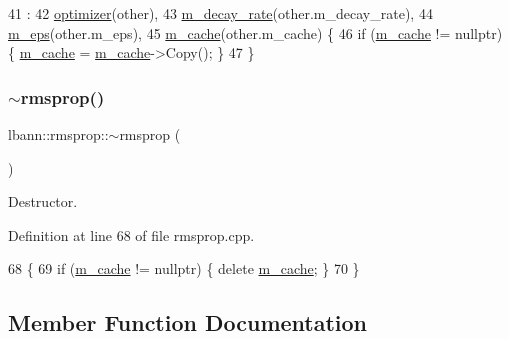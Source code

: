 \begin{DoxyCode}
41                                      :
42   \hyperlink{classlbann_1_1optimizer_a136ed79c3f279ecded5be380fb67b05f}{optimizer}(other),
43   \hyperlink{classlbann_1_1rmsprop_a9cd712c44e7c4995120e2933b0387d71}{m\_decay\_rate}(other.m\_decay\_rate),
44   \hyperlink{classlbann_1_1rmsprop_a6ea73caf5b2769451dfd798665877208}{m\_eps}(other.m\_eps),
45   \hyperlink{classlbann_1_1rmsprop_a2bbaa35bb209e971a5ac9e1dbb6ece76}{m\_cache}(other.m\_cache) \{
46   \textcolor{keywordflow}{if} (\hyperlink{classlbann_1_1rmsprop_a2bbaa35bb209e971a5ac9e1dbb6ece76}{m\_cache} != \textcolor{keyword}{nullptr}) \{ \hyperlink{classlbann_1_1rmsprop_a2bbaa35bb209e971a5ac9e1dbb6ece76}{m\_cache} = \hyperlink{classlbann_1_1rmsprop_a2bbaa35bb209e971a5ac9e1dbb6ece76}{m\_cache}->Copy(); \}
47 \}
\end{DoxyCode}
\mbox{\label{classlbann_1_1rmsprop_ae837f3c0e5b49f8baa42cc9c864259fc}} 
\subsubsection{\texorpdfstring{$\sim$rmsprop()}{~rmsprop()}}
{\footnotesize\ttfamily lbann\+::rmsprop\+::$\sim$rmsprop (\begin{DoxyParamCaption}{ }\end{DoxyParamCaption})\hspace{0.3cm}{\ttfamily [override]}}

Destructor. 

Definition at line 68 of file rmsprop.\+cpp.


\begin{DoxyCode}
68                   \{
69   \textcolor{keywordflow}{if} (\hyperlink{classlbann_1_1rmsprop_a2bbaa35bb209e971a5ac9e1dbb6ece76}{m\_cache} != \textcolor{keyword}{nullptr}) \{ \textcolor{keyword}{delete} \hyperlink{classlbann_1_1rmsprop_a2bbaa35bb209e971a5ac9e1dbb6ece76}{m\_cache}; \}
70 \}
\end{DoxyCode}


\subsection{Member Function Documentation}
\mbox{\label{classlbann_1_1rmsprop_a1493737d356809ad5c94f77051de8814}} 
